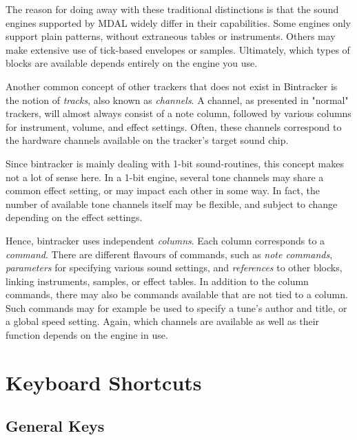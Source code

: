 \documentclass[12pt]{report}	%
\begin{document}
The reason for doing away with these traditional distinctions is that the sound engines supported by MDAL widely differ in their capabilities. Some engines only support plain patterns, without extraneous tables or instruments. Others may make extensive use of tick-based envelopes or samples. Ultimately, which types of blocks are available depends entirely on the engine you use.

Another common concept of other trackers that does not exist in Bintracker is the notion of \textit{tracks}, also known as \textit{channels}. A channel, as presented in "normal" trackers, will almost always consist of a note column, followed by various columns for instrument, volume, and effect settings. Often, these channels correspond to the hardware channels available on the tracker's target sound chip. 

Since bintracker is mainly dealing with 1-bit sound-routines, this concept makes not a lot of sense here. In a 1-bit engine, several tone channels may share a common effect setting, or may impact each other in some way. In fact, the number of available tone channels itself may be flexible, and subject to change depending on the effect settings.

Hence, bintracker uses independent \textit{columns}. Each column corresponds to a \textit{command}. There are different flavours of commands, such as \textit{note commands}, \textit{parameters} for specifying various sound settings, and \textit{references} to other blocks, linking instruments, samples, or effect tables. In addition to the column commands, there may also be commands available that are not tied to a column. Such commands may for example be used to specify a tune's author and title, or a global speed setting. Again, which channels are available as well as their function depends on the engine in use.



\chapter{Keyboard Shortcuts}
\section{General Keys}
\end{document}
